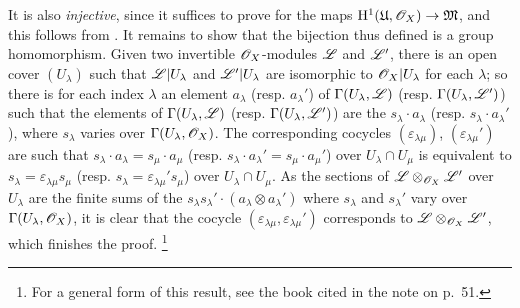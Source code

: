 \begin{env}[5.4.7]
It is also \emph{injective}, since it suffices to prove for the maps $\HH^1(\mathfrak{U},\sh{O}_X)\to\mathfrak{M}$, and this follows from .
It remains to show that
the bijection thus defined is a group homomorphism.
Given two invertible $\mathscr{O}_X$-modules $\mathscr{L}$ and $\mathscr{L}'$, there is an open cover $(U_\lambda)$ such that $\mathscr{L}|U_\lambda$ and $\mathscr{L}'|U_\lambda$ are isomorphic to $\mathscr{O}_X|U_\lambda$ for each $\lambda$;
so there is for each index $\lambda$ an element $a_\lambda$ (resp. $a_\lambda'$) of $\Gamma(U_\lambda,\mathscr{L})$ (resp. $\Gamma(U_\lambda,\mathscr{L}')$) such that the elements of $\Gamma(U_\lambda,\mathscr{L})$ (resp. $\Gamma(U_\lambda,\mathscr{L}')$) are the $s_\lambda\cdot a_\lambda$ (resp. $s_\lambda\cdot a_\lambda'$), where $s_\lambda$ varies over $\Gamma(U_\lambda,\mathscr{O}_X)$.
The corresponding cocycles $(\varepsilon_{\lambda\mu})$, $(\varepsilon_{\lambda\mu}')$ are such that $s_\lambda\cdot a_\lambda=s_\mu\cdot a_\mu$ (resp. $s_\lambda\cdot a_\lambda'=s_\mu\cdot a_\mu'$) over $U_\lambda\cap U_\mu$ is equivalent to $s_\lambda=\varepsilon_{\lambda\mu}s_\mu$ (resp. $s_\lambda=\varepsilon_{\lambda\mu}' s_\mu$) over $U_\lambda\cap U_\mu$.
As the sections of $\mathscr{L}\otimes_{\mathscr{O}_X}\mathscr{L}'$ over $U_\lambda$ are the finite sums of the $s_\lambda s_\lambda'\cdot(a_\lambda\otimes a_\lambda')$ where $s_\lambda$ and $s_\lambda'$ vary over $\Gamma(U_\lambda,\mathscr{O}_X)$, it is clear that the cocycle $(\varepsilon_{\lambda\mu},\varepsilon_{\lambda\mu}')$ corresponds to $\mathscr{L}\otimes_{\mathscr{O}_X}\mathscr{L}'$, which finishes the proof.
\footnote{For a general form of this result, see the book cited in the note on p.~51.}
\end{env}

